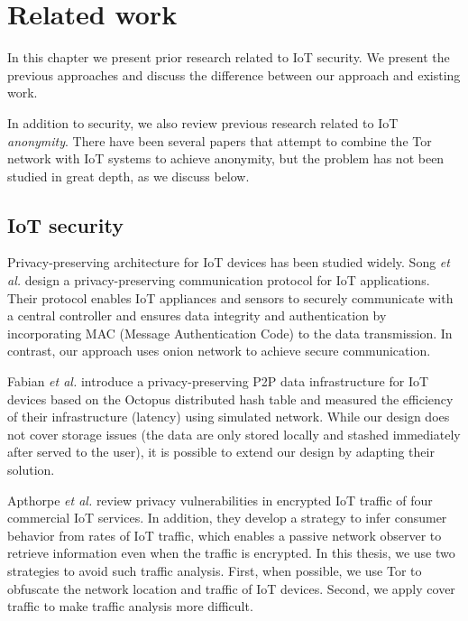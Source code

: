 \chapter{Related work}

In this chapter we present prior research related to IoT security.  We present the previous approaches and discuss the difference between our approach and existing work.

In addition to security, we also review previous research related to IoT \textit{anonymity}. There have been several papers that attempt to combine the Tor network with IoT systems to achieve anonymity, but the problem has not been studied in great depth, as we discuss below.

\section{IoT security}

Privacy-preserving architecture for IoT devices has been studied widely. Song \textit{et al.} \cite{song2017privacy} design a privacy-preserving communication protocol for IoT applications. Their protocol enables IoT appliances and sensors to securely communicate with a central controller and ensures data integrity and authentication by incorporating MAC (Message Authentication Code) to the data transmission. In contrast, our approach uses onion network to achieve secure communication.

Fabian \textit{et al.} \cite{fabian2014privacy} introduce a privacy-preserving P2P data infrastructure for IoT devices based on the Octopus distributed hash table \cite{wang2012octopus} and measured the efficiency of their infrastructure (latency) using simulated network. While our design does not cover storage issues (the data are only stored locally and stashed immediately after served to the user), it is possible to extend our design by adapting their solution.

Apthorpe \textit{et al.} \cite{apthorpe2017smart} review privacy vulnerabilities in encrypted IoT traffic of four commercial IoT services. In addition, they develop a strategy to infer consumer behavior from rates of IoT traffic, which enables a passive network observer to retrieve information even when the traffic is encrypted. In this thesis, we use two strategies to avoid such traffic analysis. First, when possible, we use Tor to obfuscate the network location and traffic of IoT devices. Second, we apply cover traffic to make traffic analysis more difficult.


